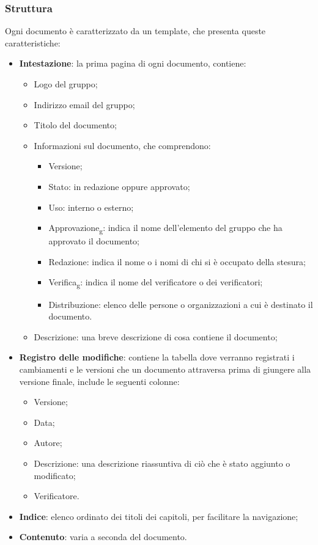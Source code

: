 \subsubsection{Struttura}
Ogni documento è caratterizzato da un template, che presenta queste
caratteristiche:
\begin{itemize}
    \item \textbf{Intestazione}: la prima pagina di ogni documento, contiene:
          \begin{itemize}
              \item Logo del gruppo;
              \item Indirizzo email del gruppo;
              \item Titolo del documento;
              \item Informazioni sul documento, che comprendono:
                    \begin{itemize}
                        \item Versione;
                        \item Stato: in redazione oppure approvato;
                        \item Uso: interno o esterno;
                        \item Approvazione\textsubscript{g}: indica il nome dell'elemento del gruppo che ha
                              approvato il documento;
                        \item Redazione: indica il nome o i nomi di chi si è occupato della stesura;
                        \item Verifica\textsubscript{g}: indica il nome del verificatore o dei verificatori;
                        \item Distribuzione: elenco delle persone o organizzazioni a cui è destinato il
                              documento.
                    \end{itemize}
              \item Descrizione: una breve descrizione di cosa contiene il documento;
          \end{itemize}
    \item \textbf{Registro delle modifiche}: contiene la tabella dove verranno registrati i cambiamenti e le versioni che un documento attraversa prima di giungere alla versione finale, include le seguenti colonne:
          \begin{itemize}
              \item Versione;
              \item Data;
              \item Autore;
              \item Descrizione: una descrizione riassuntiva di ciò che è stato aggiunto o
                    modificato;
              \item Verificatore.
          \end{itemize}
    \item \textbf{Indice}: elenco ordinato dei titoli dei capitoli, per facilitare la navigazione;
    \item \textbf{Contenuto}: varia a seconda del documento.
\end{itemize}
